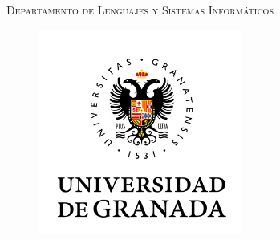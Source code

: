 \thispagestyle{empty}
		
		\vspace{0.1cm}
		
		\begin{center}
		
		    \vspace{1cm}
			{\scshape\Large \myMateria \par}
			{\scshape\large Departamento de Lenguajes y Sistemas Informáticos \par}
            \vspace{1cm}

			\begin{center}
			
			
			{\large \scshape\myDegree}
			\vspace{0.6cm}
			
			
			\begin{figure}[ht]
			\begin{center}
				\includegraphics[width=0.6\textwidth]{Images/logoUGR.jpg}
				\label{logoUGR}
			\end{center}
		\end{figure}	
		
		\LARGE	{\scshape\myReport}
        
		\vspace{1cm}	
        
        \large	 {\scshape\myName}

				\vspace{1.25cm}
				\vspace{0.9cm}
				
			\end{center}
	
		\end{center}
